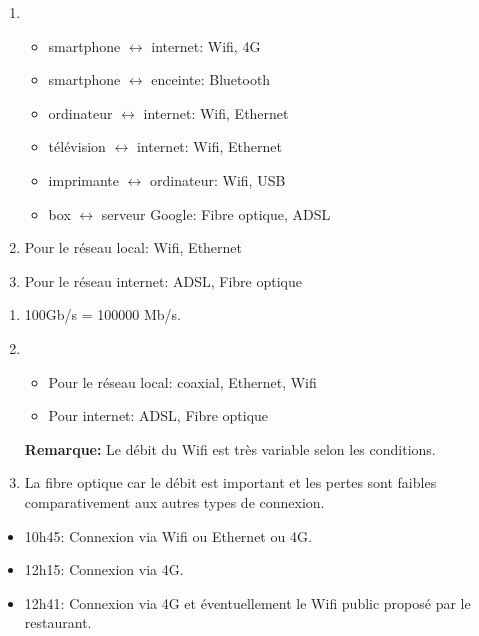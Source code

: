 \documentclass[a4paper,11pt]{article}
\begin{document}
\begin{Form}
\begin{exo}[Activité]
\begin{enumerate}
\item
\begin{itemize}
\item smartphone $\longleftrightarrow$ internet: Wifi, 4G
\item smartphone $\longleftrightarrow$ enceinte: Bluetooth
\item ordinateur $\longleftrightarrow$ internet: Wifi, Ethernet
\item télévision $\longleftrightarrow$ internet: Wifi, Ethernet
\item imprimante $\longleftrightarrow$ ordinateur: Wifi, USB
\item box $\longleftrightarrow$ serveur Google: Fibre optique, ADSL
\end{itemize}
\item Pour le réseau local: Wifi, Ethernet
\item Pour le réseau internet: ADSL, Fibre optique
\end{enumerate}
\end{exo}
\begin{exo}[Activité]
\begin{enumerate}
\item 100Gb/s = 100000 Mb/s.
\item 
\begin{itemize}
\item Pour le réseau local: coaxial, Ethernet, Wifi
\item Pour internet: ADSL, Fibre optique
\end{itemize}
\textbf{Remarque:} Le débit du Wifi est très variable selon les conditions.
\item La fibre optique car le débit est important et les pertes sont faibles comparativement aux autres types de connexion.
\end{enumerate}
\end{exo}
\begin{exo}[Activité]
\begin{itemize}
\item 10h45: Connexion via Wifi ou Ethernet ou 4G.
\item 12h15: Connexion via 4G.
\item 12h41: Connexion via 4G et éventuellement le Wifi public proposé par le restaurant.
\end{itemize}
\end{exo}

\end{Form}
\end{document}
